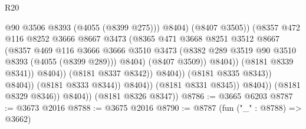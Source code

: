 \begin{lexlean}{R20}
\begin{coremodule}
                                                  @90
                                                  @3506
                                                  @8393
                                                  (@4055 (@8399 @275)))
                                                @8404)
                                              (@8407 @3505))
                                            (@8357
                                              @472
                                              @116
                                              @8252
                                              @3666
                                              @8667
                                              @3473
                                              (@8365
                                                @471
                                                @3668
                                                @8251
                                                @3512
                                                @8667
                                                (@8357
                                                  @469
                                                  @116
                                                  @3666
                                                  @3666
                                                  @3510
                                                  @3473
                                                  (@8382
                                                    @289
                                                    @3519
                                                    @90
                                                    @3510
                                                    @8393
                                                    (@4055 (@8399 @289)))
                                                  @8404)
                                                (@8407 @3509))
                                              @8404))
                                          (@8181 @8339 @8341))
                                        @8404))
                                    (@8181 @8337 @8342))
                                  @8404))
                              (@8181 @8335 @8343))
                            @8404))
                        (@8181 @8333 @8344))
                      @8404))
                  (@8181 @8331 @8345))
                @8404))
            (@8181 @8329 @8346))
          @8404))
      (@8181 @8326 @8347))
@8786 := @3665 @6203
@8787 := @3673 @2016
@8788 := @3675 @2016
@8790 := @8787 (fun ("_" : @8788) => @3662)

\end{coremodule}
\end{lexlean}
